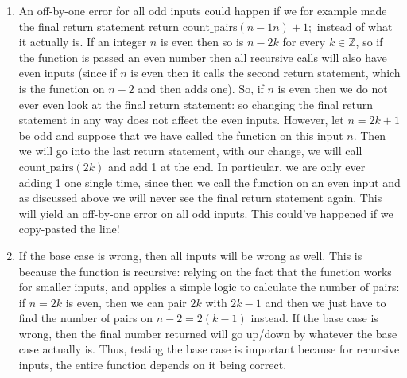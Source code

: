 \documentclass[12pt]{article}
\theoremstyle{definitionstyle}
\def\mbb#1{\mathbb{#1}}
\def\bZ{\mbb{Z}}
\begin{document}
\begin{enumerate}[leftmargin=\labelsep]
\begin{enumerate}[label=(\alph*)]
            \item An off-by-one error for all odd inputs could happen if we for example made the final return statement return $\mathrm{count\_pairs}(n-1n) + 1;$ instead of what it actually is. If an integer $n$ is even then so is $n-2k$ for every $k \in \bZ$, so if the function is passed an even number then all recursive calls will also have even inputs (since if $n$ is even then it calls the second return statement, which is the function on $n-2$ and then adds one). So, if $n$ is even then we do not ever even look at the final return statement: so changing the final return statement in any way does not affect the even inputs. However, let $n = 2k+1$ be odd and suppose that we have called the function on this input $n$. Then we will go into the last return statement, with our change, we will call $\mathrm{count\_pairs}(2k)$ and add 1 at the end. In particular, we are only ever adding 1 one single time, since then we call the function on an even input and as discussed above we will never see the final return statement again. This will yield an off-by-one error on all odd inputs. This could've happened if we copy-pasted the line!
            \item If the base case is wrong, then all inputs will be wrong as well. This is because the function is recursive: relying on the fact that the function works for smaller inputs, and applies a simple logic to calculate the number of pairs: if $n = 2k$ is even, then we can pair $2k$ with $2k-1$ and then we just have to find the number of pairs on $n-2 = 2(k-1)$ instead. If the base case is wrong, then the final number returned will go up/down by whatever the base case actually is. Thus, testing the base case is important because for recursive inputs, the entire function depends on it being correct.
        \end{enumerate}


\end{enumerate}
\end{document}
